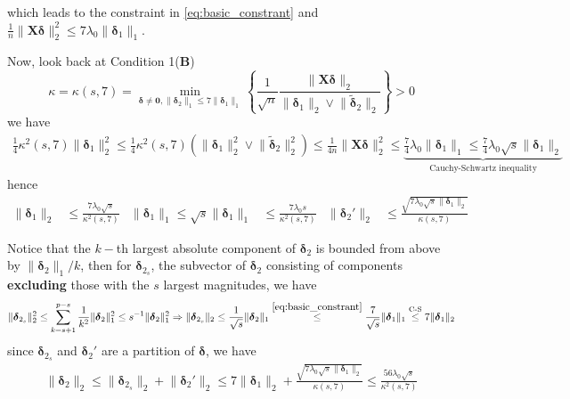 \documentclass[twoside]{article}
\begin{document}
which leads to the constraint in \ref{eq:basic_constrant} and $\frac{1}{n}\lVert \mathbf{X}\boldsymbol{\delta} \rVert ^2_2 \leq 7\lambda_0 \lVert \boldsymbol{\delta}_1 \rVert _1$.

Now, look back at Condition 1(\textbf{B})
$$
\kappa = \kappa(s,7) = \min_{\boldsymbol{\delta}\neq \mathbf{0}, \lVert\boldsymbol{\delta}_2\rVert _1 \leq 7 \lVert\boldsymbol{\delta}_1\rVert _1} \left\{ \frac{1}{\sqrt{n}}\frac{\lVert\mathbf{X}\boldsymbol{\delta}\rVert _2}{\lVert\boldsymbol{\delta}_1\rVert _2 \vee \lVert\tilde{\boldsymbol{\delta}}_2\rVert _2} \right\} > 0
$$
we have 
\begin{align*}
    \frac{1}{4}\kappa^2(s,7)\lVert\boldsymbol{\delta}_1\rVert^2_2 \leq \frac{1}{4}\kappa^2(s,7)\left( \lVert\boldsymbol{\delta}_1\rVert^2_2 \vee \lVert\tilde{\boldsymbol{\delta}}_2\rVert^2_2 \right)\leq \frac{1}{4n}\lVert\mathbf{X}\boldsymbol{\delta}\rVert^2_2\leq \underbrace{\frac{7}{4}\lambda_0 \lVert \boldsymbol{\delta}_1 \rVert _1 \leq \frac{7}{4}\lambda_0\sqrt{s} \lVert \boldsymbol{\delta}_1 \rVert _2 }_{\text{Cauchy-Schwartz inequality}}
\end{align*}
hence
\begin{align}\label{eq:L2bound_loss_subvector}
    \lVert\boldsymbol{\delta}_1\rVert _2 &\leq \frac{7\lambda_0 \sqrt{s}}{\kappa^2(s,7)} & \lVert\boldsymbol{\delta}_1\rVert _1\leq \sqrt{s} \lVert\boldsymbol{\delta}_1\rVert _1 &\leq \frac{7\lambda_0 s}{\kappa^2(s,7)} & \lVert\boldsymbol{\delta}_2'\rVert _2 &\leq \frac{\sqrt{7\lambda_0 \sqrt{s} \lVert \boldsymbol{\delta}_1 \rVert _2}}{\kappa(s,7)}
\end{align}

Notice that the $k-$th largest absolute component of $\boldsymbol{\delta}_2$ is bounded from above by $\lVert\boldsymbol{\delta}_2\rVert _1/k$, then for $\boldsymbol{\delta}_{2_s}$, the subvector of $\boldsymbol{\delta}_2$ consisting of components \textbf{excluding} those with the $s$ largest magnitudes, we have
$$
\lVert\boldsymbol{\delta}_{2_s}\rVert _2^2\leq  \sum^{p-s}_{k=s+1}\frac{1}{k^2} \lVert\boldsymbol{\delta}_2\rVert^2 _1 \leq s^{-1}\lVert\boldsymbol{\delta}_2\rVert _1^2 \Rightarrow \lVert\boldsymbol{\delta}_{2_s}\rVert _2 \leq \frac{1}{\sqrt{s}}\lVert\boldsymbol{\delta}_2\rVert _1  \overset{\ref{eq:basic_constrant}}{\leq} \frac{7}{\sqrt{s}}\lVert\boldsymbol{\delta}_1\rVert _1 \overset{\text{C-S}}{\leq} 7\lVert\boldsymbol{\delta}_1\rVert _2
$$
since $\boldsymbol{\delta}_{2_s}$ and $\boldsymbol{\delta}_{2}'$ are a partition of $\boldsymbol{\delta}$, we have 
\begin{align}\label{eq:L2bound_loss_subvector2}
    \lVert\boldsymbol{\delta}_2\rVert _2 \leq \lVert\boldsymbol{\delta}_{2_s}\rVert _2 + \lVert\boldsymbol{\delta}_2'\rVert _2 \leq 7 \lVert\boldsymbol{\delta}_1\rVert _2 + \frac{\sqrt{7\lambda_0 \sqrt{s} \lVert \boldsymbol{\delta}_1 \rVert _2}}{\kappa(s,7)}\leq  \frac{56\lambda_0 \sqrt{s}}{\kappa^2(s,7)} 
\end{align}
\end{document}
